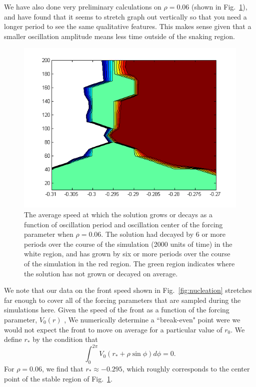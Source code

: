 \documentclass[pre,preprint,superscriptaddress]{revtex4-1}
\begin{document}
We have also done very preliminary calculations on $\rho =0.06$ (shown in Fig.~\ref{fig:Vcm006}), and have found that it seems to stretch graph out vertically so that you need a longer period to see the same qualitative features.  This makes sense given that a smaller oscillation amplitude means less time outside of the snaking region.   


\begin{figure}[h!]\center
\includegraphics[width=120mm]{Vcm006error.png}
\caption{The average speed at which the solution grows or decays as a function of oscillation period and oscillation center of the forcing parameter when $\rho=0.06$.  The solution had decayed by 6 or more periods over the course of the simulation (2000 units of time) in the white region, and has grown by six or more periods over the course of the simulation  in the red region.  The green region indicates where the solution has not grown or decayed on average.}
    \label{fig:Vcm006}
\end{figure}


We note that our data on the front speed shown in Fig.~\ref{fig:nucleation} stretches far enough to cover all of the forcing parameters that are sampled during the simulations here. Given the speed of the front as a function of the forcing parameter, $V_0(r)$ ,  We numerically determine a ``break-even" point were we would not expect the front to move on average for a particular value of $r_0$.  We define $r_*$  by the condition that 
\begin{equation}
\int_0^{2\pi} V_{0} ( r_*+\rho \sin\phi) d\phi = 0.
\end{equation}
For $\rho =0.06$, we find that $r_*\approx -0.295$, which roughly corresponds to the center point of the stable region of Fig.~\ref{fig:Vcm006}.


\end{document}
